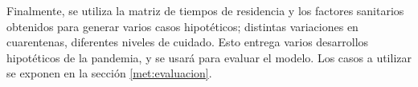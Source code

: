 Finalmente, se utiliza la matriz de tiempos de residencia y los factores sanitarios obtenidos para generar varios casos hipotéticos; distintas variaciones en cuarentenas, diferentes niveles de cuidado. Esto entrega varios desarrollos hipotéticos de la pandemia, y se usará para evaluar el modelo. Los casos a utilizar se exponen en la sección \ref{met:evaluacion}.


    
    
    
    
    
